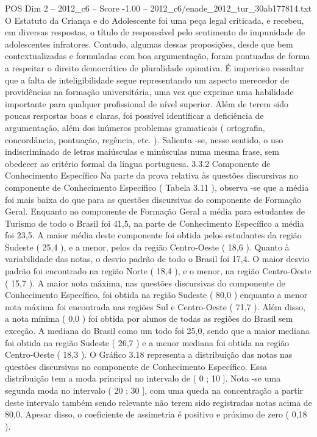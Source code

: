 \begin{textsample}{POS Dim 2 – 2012\_c6 – Score -1.00 – 2012\_c6/enade\_2012\_tur\_30ab177814.txt}
O Estatuto da Criança e do Adolescente foi uma peça legal criticada, e recebeu, em diversas respostas, o título de responsável pelo sentimento de impunidade de adolescentes infratores.
Contudo, algumas dessas proposições, desde que bem contextualizadas e formuladas com boa argumentação, foram pontuadas de forma a respeitar o direito democrático de pluralidade opinativa.
É imperioso ressaltar que a falta de inteligibilidade segue representando um aspecto merecedor de providências na formação universitária, uma vez que exprime uma habilidade importante para qualquer profissional de nível superior.
Além de terem sido poucas respostas boas e claras, foi possível identificar a deficiência de argumentação, além dos inúmeros problemas gramaticais ( ortografia, concordância, pontuação, regência, etc. ).
Salienta -se, nesse sentido, o uso indiscriminado de letras maiúsculas e minúsculas numa mesma frase, sem obedecer ao critério formal da língua portuguesa. 3.3.2 Componente de Conhecimento Específico Na parte da prova relativa às questões discursivas no componente de Conhecimento Específico ( Tabela 3.11 ), observa -se que a média foi mais baixa do que para as questões discursivas do componente de Formação Geral.
Enquanto no componente de Formação Geral a média para estudantes de Turismo de todo o Brasil foi 41,5, na parte de Conhecimento Específico a média foi 23,5.
A maior média deste componente foi obtida pelos estudantes da região Sudeste ( 25,4 ), e a menor, pelos da região Centro-Oeste ( 18,6 ).
Quanto à variabilidade das notas, o desvio padrão de todo o Brasil foi 17,4.
O maior desvio padrão foi encontrado na região Norte ( 18,4 ), e o menor, na região Centro-Oeste ( 15,7 ).
A maior nota máxima, nas questões discursivas do componente de Conhecimento Específico, foi obtida na região Sudeste ( 80,0 ) enquanto a menor nota máxima foi encontrada nas regiões Sul e Centro-Oeste ( 71,7 ).
Além disso, a nota mínima ( 0,0 ) foi obtida por alunos de todas as regiões do Brasil sem exceção.
A mediana do Brasil como um todo foi 25,0, sendo que a maior mediana foi obtida na região Sudeste ( 26,7 ) e a menor mediana foi obtida na região Centro-Oeste ( 18,3 ).
O Gráfico 3.18 representa a distribuição das notas nas questões discursivas no componente de Conhecimento Específico.
Essa distribuição tem a moda principal no intervalo de ( 0 ; 10 ].
Nota -se uma segunda moda no intervalo ( 20 ; 30 ], com uma queda na concentração a partir deste intervalo também sendo relevante não terem sido registradas notas acima de 80,0.
Apesar disso, o coeficiente de assimetria é positivo e próximo de zero ( 0,18 ).

\end{textsample}

